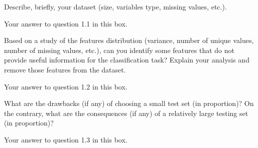 
\begin{question}{1.1}
Describe, briefly, your dataset (size, variables type, missing values, etc.).
\end{question}
\begin{answer}{3} 
    Your answer to question 1.1 in this box.
\end{answer}


\begin{question}{1.2}
Based on a study of the features distribution (variance, number of unique values, number of missing values, etc.), can you identify some features that do not provide useful information for the classification task? Explain your analysis and remove those features from the dataset. 
\end{question}
\begin{answer}{11} 
    Your answer to question 1.2 in this box.
\end{answer}



\begin{question}{1.3}
What are the drawbacks (if any) of choosing a small test set (in proportion)? On the contrary, what are the consequences (if any) of a relatively large testing set (in proportion)?
\end{question}

\begin{answer}{7} 
    Your answer to question 1.3 in this box.
\end{answer}
